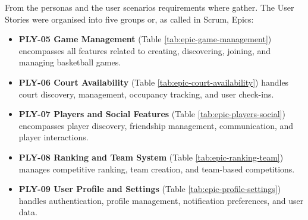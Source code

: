 From the personas and the user scenarios requirements where gather.
The User Stories were organised into five groups or, as called in Scrum, Epics:
\begin{itemize}
	\item \textbf{PLY-05 Game Management} (Table \ref{tab:epic-game-management}) encompasses all features related to creating, discovering, joining, and managing basketball games.
	\item \textbf{PLY-06 Court Availability} (Table \ref{tab:epic-court-availability}) handles court discovery, management, occupancy tracking, and user check-ins.
	\item \textbf{PLY-07 Players and Social Features} (Table \ref{tab:epic-players-social}) encompasses player discovery, friendship management, communication, and player interactions.
	\item \textbf{PLY-08 Ranking and Team System} (Table \ref{tab:epic-ranking-team}) manages competitive ranking, team creation, and team-based competitions.
	\item \textbf{PLY-09 User Profile and Settings} (Table \ref{tab:epic-profile-settings}) handles authentication, profile management, notification preferences, and user data.
\end{itemize}

